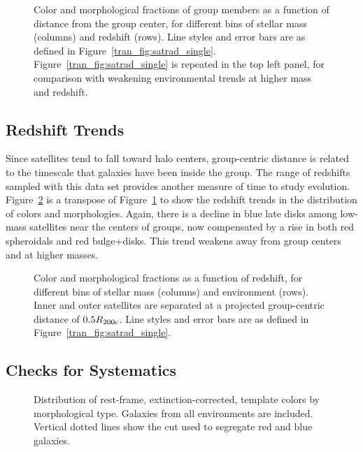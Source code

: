 \begin{figure}[htb]
\caption{Color and morphological fractions of group members as a
  function of distance from the group center, for different bins of
  stellar mass (columns) and redshift (rows). Line styles and error
  bars are as defined in
  Figure~\ref{tran_fig:satrad_single}. Figure~\ref{tran_fig:satrad_single} is
  repeated in the top left panel, for comparison with weakening
  environmental trends at higher mass and redshift.}
\label{tran_fig:satrad}
\end{figure}

\subsection{Redshift Trends}
\label{tran_s:ztrends}

Since satellites tend to fall toward halo centers, group-centric
distance is related to the timescale that galaxies have been inside
the group. The range of redshifts sampled with this data set provides
another measure of time to study evolution. Figure~\ref{tran_fig:satz} is a
transpose of Figure~\ref{tran_fig:satrad} to show the redshift trends in
the distribution of colors and morphologies. Again, there is a decline
in blue late disks among low-mass satellites near the centers of
groups, now compensated by a rise in both red spheroidals and red
bulge+disks. This trend weakens away from group centers and at
higher masses.

\begin{figure}[htb]
\caption{Color and morphological fractions as a function of redshift,
  for different bins of stellar mass (columns) and environment
  (rows). Inner and outer satellites are separated at a projected
  group-centric distance of $0.5 R_{\rm 200c}$. Line styles and error
  bars are as defined in Figure~\ref{tran_fig:satrad_single}.}
\label{tran_fig:satz}
\end{figure}

\subsection{Checks for Systematics}
\label{tran_s:systematics}

\begin{figure}[htb]
\caption{Distribution of rest-frame, extinction-corrected, template
  colors by morphological type. Galaxies from all environments are
  included. Vertical dotted lines show the cut used to segregate red
  and blue galaxies.}
\label{tran_fig:color_hist}
\end{figure}
 
